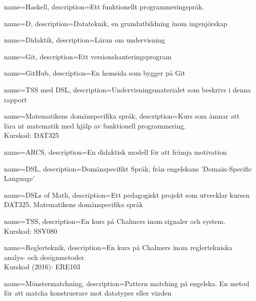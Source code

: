 
{
	name=Haskell,
	description={Ett funktionellt programmeringspråk.}
}

{
    name=D,
    description={Datateknik, en grundutbildning inom ingenjörskap}
}

{
    name=Didaktik,
    description={Läran om undervisning}
}

{
    name=Git,
    description={Ett versionshanteringsprogram}
}

{
    name=GitHub,
    description={En hemsida som bygger på Git}
}

{
    name={TSS med DSL},
    description={Undervisningsmaterialet som beskrivs i denna rapport}
}

{
    name={Matematikens domänspecifika språk},
    description={Kurs som ämnar att lära ut matematik med hjälp av funktionell programmering. \\
    Kurskod: DAT325}
}

{
    name=ARCS,
    description={En didaktisk modell för att främja motivation}
}

{
    name=DSL,
    description={Domänspecifikt Språk, från engelskans 'Domain-Specific Language'}
}

{
    name={DSLs of Math},
    description={Ett pedagogiskt projekt som utvecklar kursen DAT325, Matematikens domänspecifika språk}
}

{
    name={TSS},
    description={En kurs på Chalmers inom signaler och system. \\ Kurskod: SSY080}
}

{
    name={Reglerteknik},
    description={En kurs på Chalmers inom reglertekniska analys- och designmetoder.\\
    Kurskod (2016): ERE103}
}

{
    name={Mönstermatchning},
    description={Pattern matching på engelska. En metod för att matcha konstruerare mot datatyper eller värden}
}





